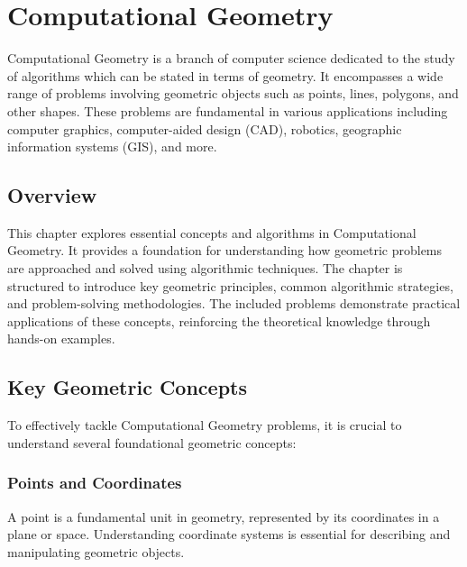 
\chapter{Computational Geometry}
\label{chap:Computational_Geometry}

Computational Geometry is a branch of computer science dedicated to the study of algorithms which can be stated in terms of geometry. It encompasses a wide range of problems involving geometric objects such as points, lines, polygons, and other shapes. These problems are fundamental in various applications including computer graphics, computer-aided design (CAD), robotics, geographic information systems (GIS), and more.

\section*{Overview}
This chapter explores essential concepts and algorithms in Computational Geometry. It provides a foundation for understanding how geometric problems are approached and solved using algorithmic techniques. The chapter is structured to introduce key geometric principles, common algorithmic strategies, and problem-solving methodologies. The included problems demonstrate practical applications of these concepts, reinforcing the theoretical knowledge through hands-on examples.

\section{Key Geometric Concepts}
To effectively tackle Computational Geometry problems, it is crucial to understand several foundational geometric concepts:

\subsection{Points and Coordinates}
A point is a fundamental unit in geometry, represented by its coordinates in a plane or space. Understanding coordinate systems is essential for describing and manipulating geometric objects.

